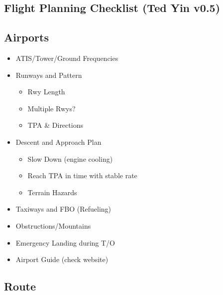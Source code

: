 \documentclass[10pt]{article}
\begin{document}
\begin{multicols*}{2}


\section{Flight Planning Checklist (Ted Yin v0.5)%
  \label{flight-planning-checklist-ted-yin-v0-5}%
}


\subsection{Airports%
  \label{airports}%
}

\begin{itemize}
\item ATIS/Tower/Ground Frequencies

\item Runways and Pattern

\begin{itemize}
\item Rwy Length

\item Multiple Rwys?

\item TPA \& Directions
\end{itemize}

\item Descent and Approach Plan

\begin{itemize}
\item Slow Down (engine cooling)

\item Reach TPA in time with stable rate

\item Terrain Hazards
\end{itemize}

\item Taxiways and FBO (Refueling)

\item Obstructions/Mountains

\item Emergency Landing during T/O

\item Airport Guide (check website)
\end{itemize}


\subsection{Route%
  \label{route}%
}


\end{multicols*}
\end{document}

